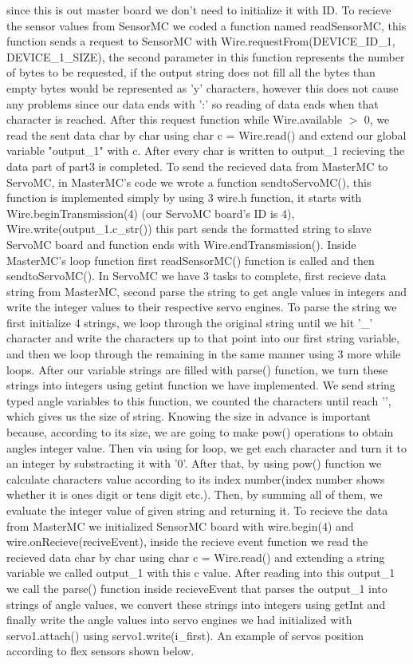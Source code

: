\documentclass[pdftex,12pt,a4paper]{article}
\begin{document}
since this is out master board we don't need to initialize it with ID. To recieve the sensor values from SensorMC we coded a function named readSensorMC, this function sends a request to SensorMC with Wire.requestFrom(DEVICE\_ID\_1, DEVICE\_1\_SIZE), the second parameter in this function represents the number of bytes to be requested, if the output string does not fill all the bytes than empty bytes would be represented as 'y' characters, however this does not cause any problems since our data ends with ':' so reading of data ends when that character is reached. After this request function while Wire.available $>$ 0, we read the sent data char by char using char c = Wire.read() and extend our global variable "output\_1" with c. After every char is written to output\_1 recieving the data part of part3 is completed. To send the recieved data from MasterMC to ServoMC, in MasterMC's code we wrote a function  sendtoServoMC(), this function is implemented simply by using 3 wire.h function, it starts with   Wire.beginTransmission(4) (our ServoMC board's ID is 4), Wire.write(output\_1.c\_str()) this part sends the formatted string to slave ServoMC board and function ends with Wire.endTransmission(). Inside MasterMC's loop function first readSensorMC() function is called and then sendtoServoMC(). In ServoMC we have 3 tasks to complete, first recieve data string from MasterMC, second parse the string to get angle values in integers and write the integer values to their respective servo engines. To parse the string we first initialize 4 strings, we loop through the original string until we hit '\_' character and write the characters up to that point into our first string variable, and then we loop through the remaining in the same manner using 3 more while loops. After our variable strings are filled with parse() function, we turn these strings into integers using getint function we have implemented. We send string typed angle variables to this function, we counted the characters until reach '\0', which gives us the size of string. Knowing the size in advance is important because, according to its size, we are going to make pow() operations to obtain angles integer value. Then via using for loop, we get each character and turn it to an integer by substracting it with '0'. After that, by using pow() function we calculate characters value according to its index number(index number shows whether it is ones digit or tens digit etc.). Then, by summing all of them, we evaluate the integer value of given string and returning it. To recieve the data from MasterMC we initialized SensorMC board with wire.begin(4) and wire.onRecieve(reciveEvent), inside the recieve event function we read the recieved data char by char using char c = Wire.read() and extending a string variable we called output\_1 with this c value. After reading into this output\_1 we call the parse() function inside recieveEvent that parses the output\_1 into strings of angle values, we convert these strings into integers using getInt and finally write the angle values into servo engines we had initialized with servo1.attach() using servo1.write(i\_first). An example of servos position according to flex sensors shown below.
\end{document}
